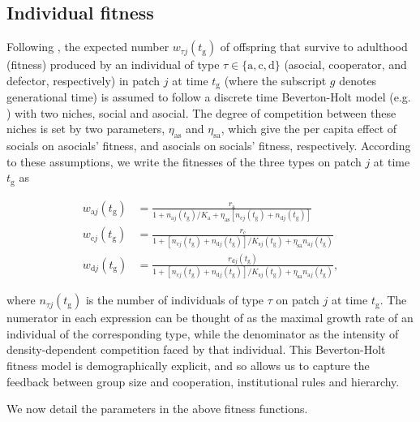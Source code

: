 \documentclass{rstb}
\begin{document}
\begin{linenumbers}
\subsection{Individual fitness}
Following \cite{Powers:2013:a}, the expected number $w_{\tau j}(t_\mathrm{g})$ of offspring that survive to adulthood (fitness) produced by an individual of type $\tau \in\{\mathrm{a},\mathrm{c},\mathrm{d}\}$ (asocial, cooperator, and defector, respectively) in patch $j$ at time $t_\mathrm{g}$ (where the subscript $g$ denotes generational time) is assumed to follow a discrete time Beverton-Holt model (e.g. \cite{Chow:2012:a}) with two niches, social and asocial. The degree of competition between these niches is set by two parameters, $\eta_{\mathrm{as}}$ and $\eta_{\mathrm{sa}}$, which give the per capita effect of socials on asocials' fitness, and asocials on socials' fitness, respectively. According to these assumptions, we write the fitnesses of the three types on patch $j$ at time $t_\mathrm{g}$ as
\begin{linenomath}
\begin{align}
\label{eqnwl}
w_{\mathrm{a}j}(t_\mathrm{g}) &= \frac{r_{\mathrm{a}}}{1 + n_{\mathrm{a}j}(t_\mathrm{g})/K_\mathrm{a}+\eta_{\mathrm{as}}\left[n_{\mathrm{c}j}(t_\mathrm{g})+n_{\mathrm{d}j}(t_\mathrm{g})\right]}  \nonumber\\
w_{\mathrm{c}j}(t_\mathrm{g}) &= \frac{r_{\mathrm{c}}}{1 + \left[n_{\mathrm{c}j}(t_\mathrm{g})+n_{\mathrm{d}j}(t_\mathrm{g}) \right]/K_{\mathrm{s}j}(t_\mathrm{g}) +\eta_{\mathrm{sa}}n_{\mathrm{a}j}(t_\mathrm{g})}\nonumber\\
w_{\mathrm{d}j}(t_\mathrm{g}) &= \frac{r_{\mathrm{d}j}(t_\mathrm{g})}{1 + \left[n_{\mathrm{c}j}(t_\mathrm{g})+n_{\mathrm{d}j}(t_\mathrm{g})\right]/K_{\mathrm{s}j}(t_\mathrm{g}) +\eta_{\mathrm{sa}}n_{\mathrm{a}j}(t_\mathrm{g})}, 
\end{align}
\end{linenomath}
where $n_{\tau j}(t_\mathrm{g})$ is the number of individuals of type $\tau$ on patch $j$ at time $t_\mathrm{g}$. The numerator in each expression can be thought of as the maximal growth rate of an individual of the corresponding type, while the denominator as the intensity of density-dependent competition faced by that individual. This Beverton-Holt fitness model is demographically explicit, and so allows us to capture the feedback between group size and cooperation, institutional rules and hierarchy. 

We now detail the parameters in the above fitness functions.


\end{linenumbers}
\end{document}
